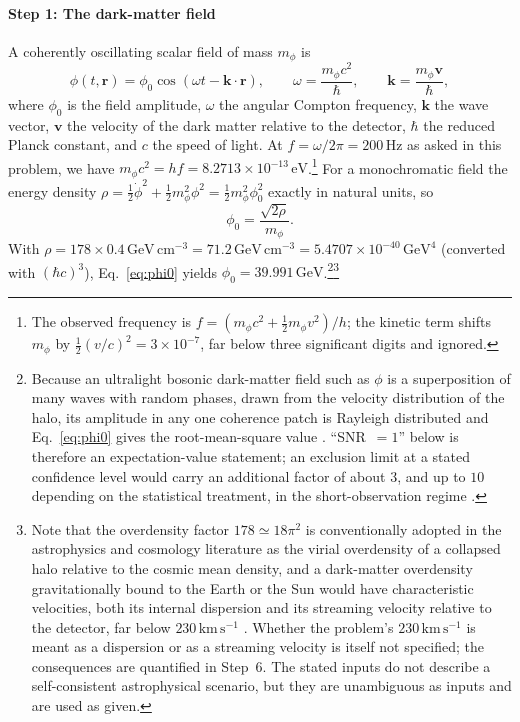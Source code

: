 \paragraph*{Step 1: The dark-matter field}
A coherently oscillating scalar field of mass $m_\phi$ is
%
\begin{equation}
\phi(t,\mathbf r)=\phi_0\cos(\omega t-\mathbf k\cdot\mathbf r),\qquad \omega=\frac{m_\phi c^2}{\hbar},\qquad \mathbf k=\frac{m_\phi\mathbf v}{\hbar},
\label{eq:field}
\end{equation}
%
where $\phi_0$ is the field amplitude, $\omega$ the angular Compton frequency, $\mathbf k$ the wave vector, $\mathbf v$ the velocity of the dark matter relative to the detector, $\hbar$ the reduced Planck constant, and $c$ the speed of light. At $f=\omega/2\pi=200\,\mathrm{Hz}$ as asked in this problem, we have $m_\phi c^2=hf=8.2713\times10^{-13}\,\mathrm{eV}$.\footnote{The observed frequency is $f=(m_\phi c^2+\tfrac12 m_\phi v^2)/h$; the kinetic term shifts $m_\phi$ by $\tfrac12(v/c)^2=3\times10^{-7}$, far below three significant digits and ignored.} For a monochromatic field the energy density $\rho=\tfrac12\dot\phi^2+\tfrac12 m_\phi^2\phi^2=\tfrac12 m_\phi^2\phi_0^2$ exactly in natural units, so
\begin{equation}
\phi_0=\frac{\sqrt{2\rho}}{m_\phi}.
\label{eq:phi0}
\end{equation}
With $\rho=178\times0.4\,\mathrm{GeV\,cm^{-3}}=71.2\,\mathrm{GeV\,cm^{-3}}=5.4707\times10^{-40}\,\mathrm{GeV}^4$ (converted with $(\hbar c)^3$), Eq.~\eqref{eq:phi0} yields $\phi_0=39.991\,\mathrm{GeV}$.\footnote{Because an ultralight bosonic dark-matter field such as $\phi$ is a superposition of many waves with random phases, drawn from the velocity distribution of the halo, its amplitude in any one coherence patch is Rayleigh distributed and Eq.~\eqref{eq:phi0} gives the root-mean-square value \citep{Centers2021}. ``SNR~$=1$'' below is therefore an expectation-value statement; an exclusion limit at a stated confidence level would carry an additional factor of about $3$, and up to $10$ depending on the statistical treatment, in the short-observation regime \citep{Centers2021}.}\footnote{Note that the overdensity factor $178\simeq18\pi^2$ is conventionally adopted in the astrophysics and cosmology literature as the virial overdensity of a collapsed halo relative to the cosmic mean density, and a dark-matter overdensity gravitationally bound to the Earth or the Sun would have characteristic velocities, both its internal dispersion and its streaming velocity relative to the detector, far below $230\,\mathrm{km\,s^{-1}}$ \citep[Sec.~III~F]{GroteStadnik2019}. Whether the problem's $230\,\mathrm{km\,s^{-1}}$ is meant as a dispersion or as a streaming velocity is itself not specified; the consequences are quantified in Step~6. The stated inputs do not describe a self-consistent astrophysical scenario, but they are unambiguous as inputs and are used as given.}

